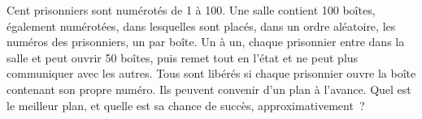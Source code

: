 \begin{question}\label{iq:iv1:counting-and-symmetry:40}
Cent prisonniers sont numérotés de 1 à 100. Une salle contient 100 boîtes, également numérotées, dans lesquelles sont placés, dans un ordre aléatoire, les numéros des prisonniers, un par boîte. Un à un, chaque prisonnier entre dans la salle et peut ouvrir 50 boîtes, puis remet tout en l'état et ne peut plus communiquer avec les autres. Tous sont libérés si chaque prisonnier ouvre la boîte contenant son propre numéro. Ils peuvent convenir d'un plan à l'avance. Quel est le meilleur plan, et quelle est sa chance de succès, approximativement~?
\end{question}
